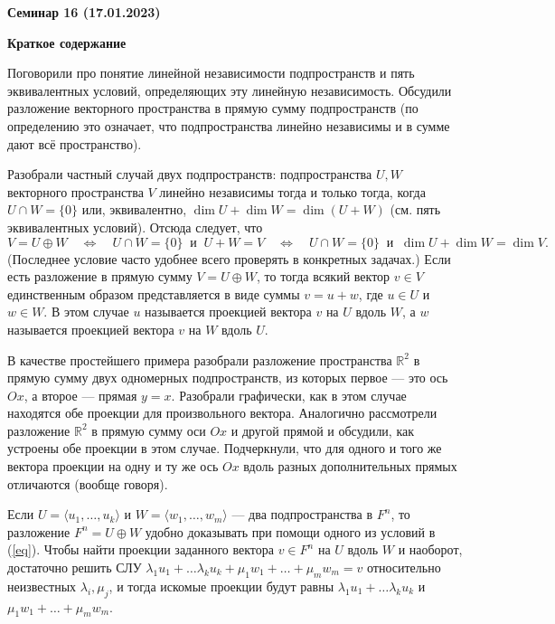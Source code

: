 \documentclass[10pt, a4paper]{extarticle}
\def \R{\mathbb{R}}
\theoremstyle{definition}
\begin{document}
\begin{center}
\small
\noindent{}
\end{center}

\large

\begin{center}
\textbf{Семинар 16 (17.01.2023)}
\end{center}

\textbf{Краткое содержание}

Поговорили про понятие линейной независимости подпространств и пять эквивалентных условий, определяющих эту линейную независимость.
Обсудили разложение векторного пространства в прямую сумму подпространств (по определению это означает, что подпространства линейно 
независимы и в сумме дают всё пространство).

Разобрали частный случай двух подпространств: подпространства $U,W$ векторного пространства $V$ линейно независимы тогда и только тогда, когда 
$U \cap W = \lbrace 0 \rbrace$ или, эквивалентно, $\dim U + \dim W = \dim (U+W)$ (см. пять эквивалентных условий).
Отсюда следует, что
\begin{equation} \label{eq}
V = U \oplus W \quad \Leftrightarrow \quad U \cap W = \lbrace 0 \rbrace \ \text{ и } \ U + W = V \quad \Leftrightarrow \quad 
U \cap W = \lbrace 0 \rbrace \ \text{ и } \ \dim U + \dim W = \dim V.
\end{equation}
(Последнее условие часто удобнее всего проверять в конкретных задачах.)
Если есть разложение в прямую сумму $V = U \oplus W$, то тогда всякий вектор $v \in V$ единственным образом представляется в 
виде суммы $v = u + w$, где $u \in U$ и $w \in W$. В этом случае $u$ называется проекцией вектора $v$ на $U$ вдоль $W$, а $w$ 
называется проекцией вектора $v$ на $W$ вдоль $U$.

В качестве простейшего примера разобрали разложение пространства $\R^2$ в прямую сумму двух одномерных подпространств, 
из которых первое --- это ось $Ox$, а второе --- прямая $y = x$. Разобрали графически, как в этом случае находятся обе 
проекции для произвольного вектора. Аналогично рассмотрели разложение $\R^2$ в прямую сумму оси $Ox$ и другой прямой и 
обсудили, как устроены обе проекции в этом случае. Подчеркнули, что для одного и того же вектора проекции на одну и ту же 
ось $Ox$ вдоль разных дополнительных прямых отличаются (вообще говоря).

Если $U = \langle u_1,\dots, u_k \rangle$ и $W = \langle w_1,\dots, w_m\rangle$ --- два подпространства в $F^n$, 
то разложение $F^n = U \oplus W$ удобно доказывать при помощи одного из условий в (\ref{eq}).
Чтобы найти проекции заданного вектора $v \in F^n$ на $U$ вдоль $W$ и наоборот, достаточно решить СЛУ 
$\lambda_1u_1 + \dots \lambda_k u_k + \mu_1 w_1+ \dots + \mu_m w_m = v$ относительно неизвестных $\lambda_i, \mu_j$, 
и тогда искомые проекции будут равны $\lambda_1u_1 + \dots \lambda_k u_k$ и $\mu_1 w_1+ \dots + \mu_m w_m$.
\end{document}
